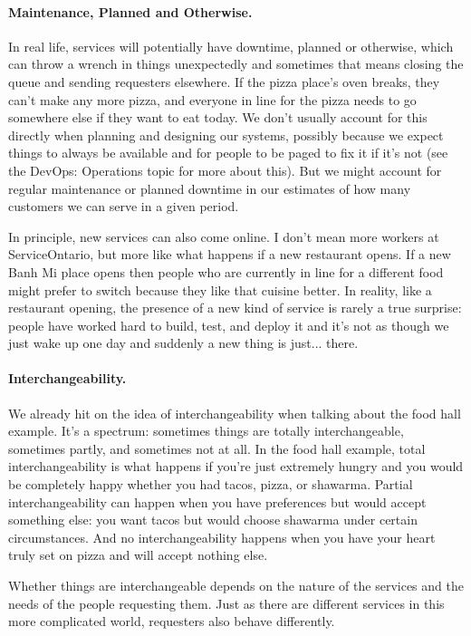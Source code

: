 \paragraph{Maintenance, Planned and Otherwise.}
In real life, services will potentially have downtime, planned or otherwise, which can throw a wrench in things unexpectedly and sometimes that means closing the queue and sending requesters elsewhere. If the pizza place's oven breaks, they can't make any more pizza, and everyone in line for the pizza needs to go somewhere else if they want to eat today. We don't usually account for this directly when planning and designing our systems, possibly because we expect things to always be available and for people to be paged to fix it if it's not (see the DevOps: Operations topic for more about this). But we might account for regular maintenance or planned downtime in our estimates of how many customers we can serve in a given period.

In principle, new services can also come online. I don't mean more workers at ServiceOntario, but more like what happens if a new restaurant opens. If a new Banh Mi place opens then people who are currently in line for a different food might prefer to switch because they like that cuisine better. In reality, like a restaurant opening, the presence of a new kind of service is rarely a true surprise: people have worked hard to build, test, and deploy it and it's not as though we just wake up one day and suddenly a new thing is just... there.

\paragraph{Interchangeability.} We already hit on the idea of interchangeability when talking about the food hall example. It's a spectrum: sometimes things are totally interchangeable, sometimes partly, and sometimes not at all. In the food hall example, total interchangeability is what happens if you're just extremely hungry and you would be completely happy whether you had tacos, pizza, or shawarma. Partial interchangeability can happen when you have preferences but would accept something else: you want tacos but would choose shawarma under certain circumstances. And no interchangeability happens when you have your heart truly set on pizza and will accept nothing else.

Whether things are interchangeable depends on the nature of the services and the needs of the people requesting them. Just as there are different services in this more complicated world, requesters also behave differently.

